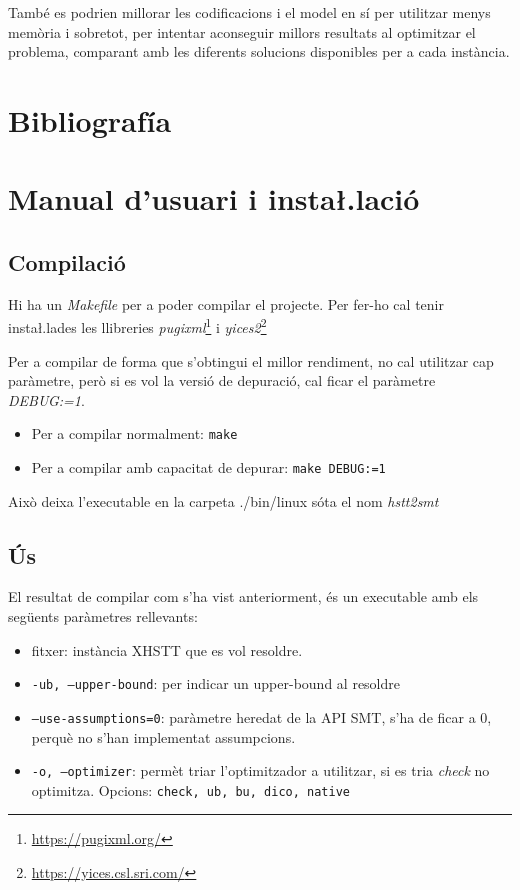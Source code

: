 \documentclass[11pt,a4paper,twoside]{report}
\begin{document}
  També es podrien millorar les codificacions i el model en sí per utilitzar menys memòria i sobretot, per intentar aconseguir millors resultats al optimitzar el problema, comparant amb les diferents solucions disponibles per a cada instància.

  \nocite{*}
  \chapter{Bibliografía}
  \printbibliography[heading=none]
  \chapter{Manual d'usuari i insta\l.lació}

  \section{Compilació}

  Hi ha un \textit{Makefile} per a poder compilar el projecte. Per fer-ho cal tenir insta\l.lades les llibreries \textit{pugixml}\footnote{\url{https://pugixml.org/}} i \textit{yices2}\footnote{\url{https://yices.csl.sri.com/}}
  
  Per a compilar de forma que s'obtingui el millor rendiment, no cal utilitzar cap paràmetre, però si es vol la versió de depuració, cal ficar el paràmetre \textit{DEBUG:=1}.
  \begin{center}
  \begin{itemize}
    \item Per a compilar normalment: \texttt{make}
    \item Per a compilar amb capacitat de depurar: \texttt{make DEBUG:=1}
  \end{itemize}
  \end{center}

  Això deixa l'executable en la carpeta ./bin/linux sóta el nom \textit{hstt2smt}


  \section{Ús}
  
  El resultat de compilar com s'ha vist anteriorment, és un executable amb els següents paràmetres rellevants:
  \begin{itemize}
    \item fitxer: instància XHSTT que es vol resoldre.
    \item \texttt{-ub, --upper-bound}: per indicar un upper-bound al resoldre
    \item \texttt{--use-assumptions=0}: paràmetre heredat de la API SMT, s'ha de ficar a 0, perquè no s'han implementat assumpcions.
    \item \texttt{-o, --optimizer}: permèt triar l'optimitzador a utilitzar, si es tria \textit{check} no optimitza. Opcions: \texttt{check, ub, bu, dico, native}
  \end{itemize}
\end{document}
